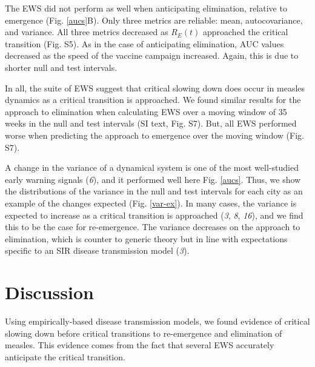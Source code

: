 \documentclass[3p]{elsarticle} %
\begin{document}
The EWS did not perform as well when anticipating elimination, relative
to emergence (Fig. \ref{aucs}B). Only three metrics are reliable: mean,
autocovariance, and variance. All three metrics decreased as \(R_E(t)\)
approached the critical transition (Fig. S5). As in the case of
anticipating elimination, AUC values decreased as the speed of the
vaccine campaign increased. Again, this is due to shorter null and test
intervals.

In all, the suite of EWS suggest that critical slowing down does occur
in measles dynamics as a critical transition is approached. We found
similar results for the approach to elimination when calculating EWS
over a moving window of 35 weeks in the null and test intervals (SI
text, Fig. S7). But, all EWS performed worse when predicting the
approach to emergence over the moving window (Fig. S7).

A change in the variance of a dynamical system is one of the most
well-studied early warning signals (\emph{6}), and it performed well
here Fig. \ref{aucs}. Thus, we show the distributions of the variance in
the null and test intervals for each city as an example of the changes
expected (Fig. \ref{var-ex}). In many cases, the variance is expected to
increase as a critical transition is approached (\emph{3}, \emph{8},
\emph{16}), and we find this to be the case for re-emergence. The
variance decreases on the approach to elimination, which is counter to
generic theory but in line with expectations specific to an SIR disease
transmission model (\emph{3}).

\hypertarget{discussion}{%
\section{Discussion}\label{discussion}}

Using empirically-based disease transmission models, we found evidence
of critical slowing down before critical transitions to re-emergence and
elimination of measles. This evidence comes from the fact that several
EWS accurately anticipate the critical transition.
\end{document}
